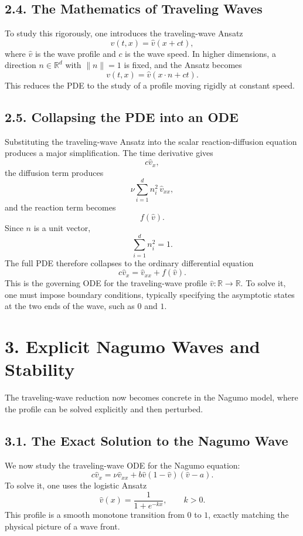 \documentclass[11pt]{article}
\theoremstyle{definition}
\theoremstyle{remark}
\begin{document}
\subsection*{2.4. The Mathematics of Traveling Waves}
To study this rigorously, one introduces the traveling-wave Ansatz
\[
v(t,x)=\widehat v(x+ct),
\]
where \(\widehat v\) is the wave profile and \(c\) is the wave speed. In higher dimensions, a direction \(n\in\mathbb R^d\) with \(\|n\|=1\) is fixed, and the Ansatz becomes
\[
v(t,x)=\widehat v(x\cdot n+ct).
\]
This reduces the PDE to the study of a profile moving rigidly at constant speed.

\subsection*{2.5. Collapsing the PDE into an ODE}
Substituting the traveling-wave Ansatz into the scalar reaction-diffusion equation produces a major simplification. The time derivative gives
\[
c\widehat v_x,
\]
the diffusion term produces
\[
\nu\sum_{i=1}^d n_i^2\,\widehat v_{xx},
\]
and the reaction term becomes
\[
f(\widehat v).
\]
Since \(n\) is a unit vector,
\[
\sum_{i=1}^d n_i^2=1.
\]
The full PDE therefore collapses to the ordinary differential equation
\[
c\widehat v_x=\widehat v_{xx}+f(\widehat v).
\]
This is the governing ODE for the traveling-wave profile \(\widehat v:\mathbb R\to\mathbb R\). To solve it, one must impose boundary conditions, typically specifying the asymptotic states at the two ends of the wave, such as \(0\) and \(1\).

\section*{3. Explicit Nagumo Waves and Stability}
The traveling-wave reduction now becomes concrete in the Nagumo model, where the profile can be solved explicitly and then perturbed.

\subsection*{3.1. The Exact Solution to the Nagumo Wave}
We now study the traveling-wave ODE for the Nagumo equation:
\[
c\widehat v_x=\nu \widehat v_{xx}+b\widehat v(1-\widehat v)(\widehat v-a).
\]
To solve it, one uses the logistic Ansatz
\[
\widehat v(x)=\frac{1}{1+e^{-kx}},
\qquad k>0.
\]
This profile is a smooth monotone transition from \(0\) to \(1\), exactly matching the physical picture of a wave front.
\end{document}
